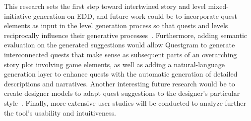 




This research sets the first step toward intertwined story and level mixed-initiative generation on EDD, and future work could be to incorporate quest elements as input in the level generation process so that quests and levels reciprocally influence their generative processes~. Furthermore, adding semantic evaluation on the generated suggestions would allow Questgram to generate interconnected quests that make sense as subsequent parts of an overarching story plot involving game elements, as well as adding a natural-language generation layer to enhance quests with the automatic generation of detailed descriptions and narratives. Another interesting future research would be to create designer models to adapt quest suggestions to the designer's particular style~. Finally, more extensive user studies will be conducted to analyze further the tool's usability and intuitiveness. 









